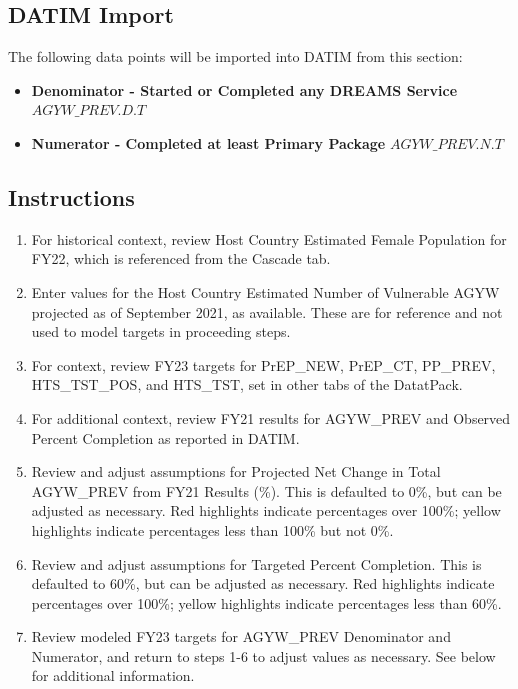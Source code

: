 \documentclass[
  openany]{book}
\begin{document}
\hypertarget{datim-import-57}{%
\subsection{DATIM Import}\label{datim-import-57}}

The following data points will be imported into DATIM from this section:

\begin{itemize}
\item
  \textbf{Denominator - Started or Completed any DREAMS Service}
  \(AGYW\_PREV.D.T\)
\item
  \textbf{Numerator - Completed at least Primary Package} \(AGYW\_PREV.N.T\)
\end{itemize}

\hypertarget{instructions-57}{%
\subsection{Instructions}\label{instructions-57}}

\begin{enumerate}
\def\labelenumi{\arabic{enumi}.}
\item
  For historical context, review Host Country Estimated Female
  Population for FY22, which is referenced from the Cascade tab.
\item
  Enter values for the Host Country Estimated Number of Vulnerable
  AGYW projected as of September 2021, as available. These are for
  reference and not used to model targets in proceeding steps.
\item
  For context, review FY23 targets for PrEP\_NEW, PrEP\_CT, PP\_PREV,
  HTS\_TST\_POS, and HTS\_TST, set in other tabs of the DatatPack.
\item
  For additional context, review FY21 results for AGYW\_PREV and
  Observed Percent Completion as reported in DATIM.
\item
  Review and adjust assumptions for Projected Net Change in Total
  AGYW\_PREV from FY21 Results (\%). This is defaulted to 0\%, but can be
  adjusted as necessary. Red highlights indicate percentages over
  100\%; yellow highlights indicate percentages less than 100\% but not
  0\%.
\item
  Review and adjust assumptions for Targeted Percent Completion. This
  is defaulted to 60\%, but can be adjusted as necessary. Red
  highlights indicate percentages over 100\%; yellow highlights
  indicate percentages less than 60\%.
\item
  Review modeled FY23 targets for AGYW\_PREV Denominator and Numerator,
  and return to steps 1-6 to adjust values as necessary. See below for
  additional information.
\end{enumerate}
\end{document}
